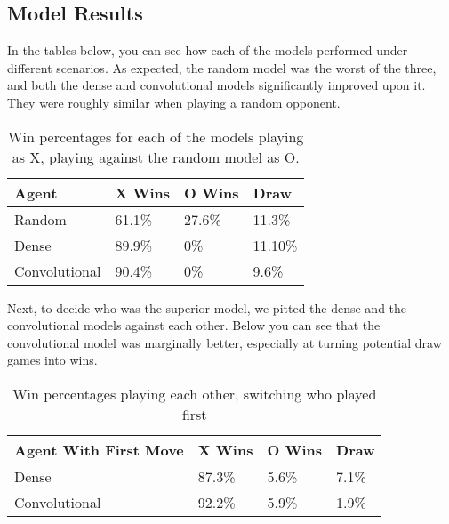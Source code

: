 \subsection{Model Results}

In the tables below, you can see how each of the models performed under different scenarios.
As expected, the random model was the worst of the three, and both the dense and convolutional models significantly improved upon it.
They were roughly similar when playing a random opponent.

	\begin{table}[H]
	\centering
	\begin{tabular}{llll}
		\hline
		\textbf{Agent} & \textbf{X Wins} & \textbf{O Wins} & \textbf{Draw} \\ \hline
		Random         & 61.1\%          & 27.6\%          & 11.3\%        \\
		Dense          & 89.9\%          & 0\%             & 11.10\%       \\
		Convolutional  & 90.4\%          & 0\%             & 9.6\%         \\ \hline
	\end{tabular}
	\caption{Win percentages for each of the models playing as X, playing against the random model as O.}
\end{table}

Next, to decide who was the superior model, we pitted the dense and the convolutional models against each other.
Below you can see that the convolutional model was marginally better, especially at turning potential draw games into wins.

\begin{table}[H]
	\centering
	\begin{tabular}{llll}
		\hline
		\textbf{Agent With First Move} & \textbf{X Wins} & \textbf{O Wins} & \textbf{Draw} \\ \hline
		Dense           			   & 87.3\%          & 5.6\%           & 7.1\%         \\
		Convolutional   			   & 92.2\%          & 5.9\%           & 1.9\%         \\ \hline
	\end{tabular}
	\caption{Win percentages playing each other, switching who played first}
\end{table}

